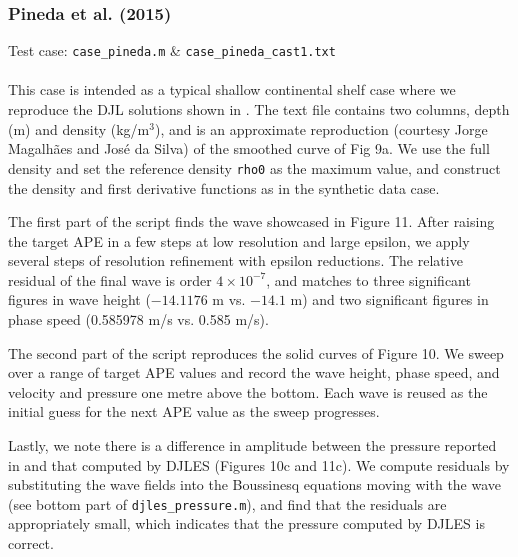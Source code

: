 \documentclass[letterpaper]{article}
\begin{document}
\subsubsection{Pineda et al. (2015)}
Test case: \verb"case_pineda.m" \&  \verb"case_pineda_cast1.txt" \\\\
This case is intended as a typical shallow continental shelf case where we reproduce the DJL solutions shown in \cite{PinedaEtAl2015}.
The text file contains two columns, depth (m) and density (kg/m$^3$), and is an approximate reproduction (courtesy Jorge Magalh\~aes and Jos\'e da Silva) of the smoothed curve of Fig 9a.
We use the full density and set the reference density \verb+rho0+ as the maximum value, and construct the density and first derivative functions as in the synthetic data case.

The first part of the script finds the wave showcased in Figure 11.
After raising the target APE in a few steps at low resolution and large epsilon, we apply several steps of resolution refinement with epsilon reductions.
The relative residual of the final wave is order $4\times 10^{-7}$, and matches \citep{PinedaEtAl2015} to three significant figures in wave height ($-14.1176$ m vs. $-14.1$ m) and two significant figures in phase speed (0.585978 m/s vs. 0.585 m/s).

The second part of the script reproduces the solid curves of Figure 10.
We sweep over a range of target APE values and record the wave height, phase speed, and velocity and pressure one metre above the bottom.
Each wave is reused as the initial guess for the next APE value as the sweep progresses. 

Lastly, we note there is a difference in amplitude between the pressure reported in \cite{PinedaEtAl2015} and that computed by DJLES (Figures 10c and 11c).
We compute residuals by substituting the wave fields into the Boussinesq equations moving with the wave (see bottom part of \verb+djles_pressure.m+), and find that the residuals are appropriately small, which indicates that the pressure computed by DJLES is correct.



\end{document}
